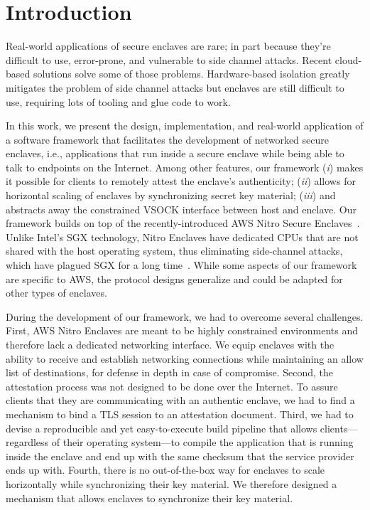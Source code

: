 \section{Introduction}

Real-world applications of secure enclaves are rare; in part because they're difficult to use, error-prone, and vulnerable to side channel attacks.  Recent cloud-based solutions solve some of those problems.  Hardware-based isolation greatly mitigates the problem of side channel attacks but enclaves are still difficult to use, requiring lots of tooling and glue code to work.

In this work, we present the design, implementation, and real-world application of a software framework that facilitates the development of networked secure enclaves, i.e., applications that run inside a secure enclave while being able to talk to endpoints on the Internet.  Among other features, our framework (\emph{i}) makes it possible for clients to remotely attest the enclave's authenticity; (\emph{ii}) allows for horizontal scaling of enclaves by synchronizing secret key material; (\emph{iii}) and abstracts away the constrained VSOCK interface between host and enclave.  Our framework builds on top of the recently-introduced AWS Nitro Secure Enclaves~\cite{nitro-enclaves}.  Unlike Intel's SGX technology, Nitro Enclaves have dedicated CPUs that are not shared with the host operating system, thus eliminating side-channel attacks, which have plagued SGX for a long time~\cite[\S~III]{Nilsson20a}.  While some aspects of our framework are specific to AWS, the protocol designs generalize and could be adapted for other types of enclaves.

During the development of our framework, we had to overcome several challenges.  First, AWS Nitro Enclaves are meant to be highly constrained environments and therefore lack a dedicated networking interface.  We equip enclaves with the ability to receive and establish networking connections while maintaining an allow list of destinations, for defense in depth in case of compromise.
%
Second, the attestation process was not designed to be done over the Internet.  To assure clients that they are communicating with an authentic enclave, we had to find a mechanism to bind a TLS session to an attestation document.
%
Third, we had to devise a reproducible and yet easy-to-execute build pipeline that allows clients---regardless of their operating system---to compile the application that is running inside the enclave and end up with the same checksum that the service provider ends up with.
%
Fourth, there is no out-of-the-box way for enclaves to scale horizontally while synchronizing their key material.  We therefore designed a mechanism that allows enclaves to synchronize their key material.

